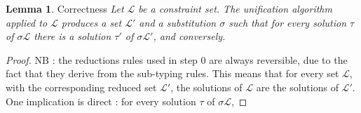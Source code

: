 \documentclass[9pt]{article}
\theoremstyle{plain}
\theoremstyle{definition}
\newtheorem{lemma}{Lemma}[section]
\begin{document}
\begin{lemma}{Correctness}
	\textit{Let $\mathcal{L}$ be a constraint set. The unification algorithm applied to $\mathcal{L}$ produces a
		set $\mathcal{L'}$ and a substitution $\sigma$ such that for every solution $\tau$ of $\sigma \mathcal{L}$ there is a solution $\tau'$
		of $\sigma\mathcal{L'}$, and conversely.}

	\begin{proof}
		NB : the reductions rules used in step 0 are always reversible, due to the fact that they derive from the sub-typing rules.
		This means that for every set $\mathcal{L}$, with the corresponding reduced set $\mathcal{L'}$, the solutions of
		$\mathcal{L}$ are the solutions of $\mathcal{L'}$. \\
		One implication is direct : for every solution $\tau$ of $\sigma \mathcal{L}$,
	\end{proof}
\end{lemma}
\end{document}
